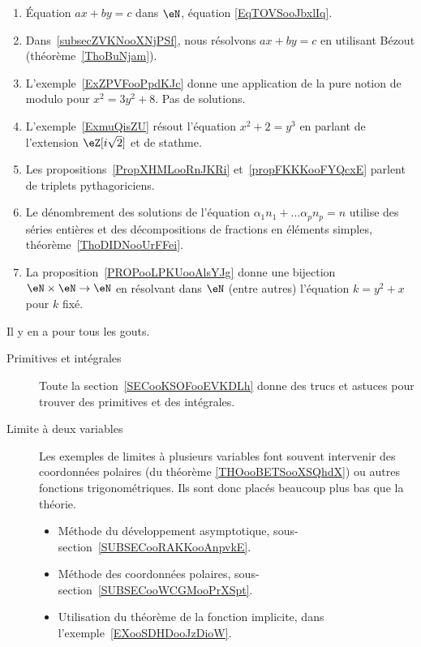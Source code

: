     \begin{enumerate}
        \item
            Équation \( ax+by=c\) dans \( \eN\), équation \eqref{EqTOVSooJbxlIq}.
        \item Dans~\ref{subsecZVKNooXNjPSf}, nous résolvons \( ax+by=c\) en utilisant Bézout (théorème~\ref{ThoBuNjam}).
        \item L'exemple~\ref{ExZPVFooPpdKJc} donne une application de la pure notion de modulo pour \( x^2=3y^2+8\). Pas de solutions.
        \item L'exemple~\ref{ExmuQisZU} résout l'équation \( x^2+2=y^3\) en parlant de l'extension \( \eZ[i\sqrt{2}]\) et de stathme.
        \item Les propositions~\ref{PropXHMLooRnJKRi} et~\ref{propFKKKooFYQcxE} parlent de triplets pythagoriciens.
        \item Le dénombrement des solutions de l'équation \( \alpha_1 n_1+\ldots \alpha_pn_p=n\) utilise des séries entières et des décompositions de fractions en éléments simples, théorème~\ref{ThoDIDNooUrFFei}.
        \item La proposition~\ref{PROPooLPKUooAlsYJg} donne une bijection \( \eN\times \eN\to \eN\) en résolvant dans \( \eN\) (entre autres) l'équation \( k=y^2+x\) pour \( k\) fixé.
        \end{enumerate}

        \label{THEMEooLTCIooGDIPnF}

Il y en a pour tous les gouts.

\begin{description}
    \item[Primitives et intégrales]
        Toute la section~\ref{SECooKSOFooEVKDLh} donne des trucs et astuces pour trouver des primitives et des intégrales.
    \item[Limite à deux variables]

        Les exemples de limites à plusieurs variables font souvent intervenir des coordonnées polaires (du théorème \ref{THOooBETSooXSQhdX}) ou autres fonctions trigonométriques. Ils sont donc placés beaucoup plus bas que la théorie.
        \begin{itemize}
            \item Méthode du développement asymptotique, sous-section~\ref{SUBSECooRAKKooAnpvkE}.
            \item Méthode des coordonnées polaires, sous-section~\ref{SUBSECooWCGMooPrXSpt}.
            \item Utilisation du théorème de la fonction implicite, dans l'exemple~\ref{EXooSDHDooJzDioW}.
        \end{itemize}

\end{description}

